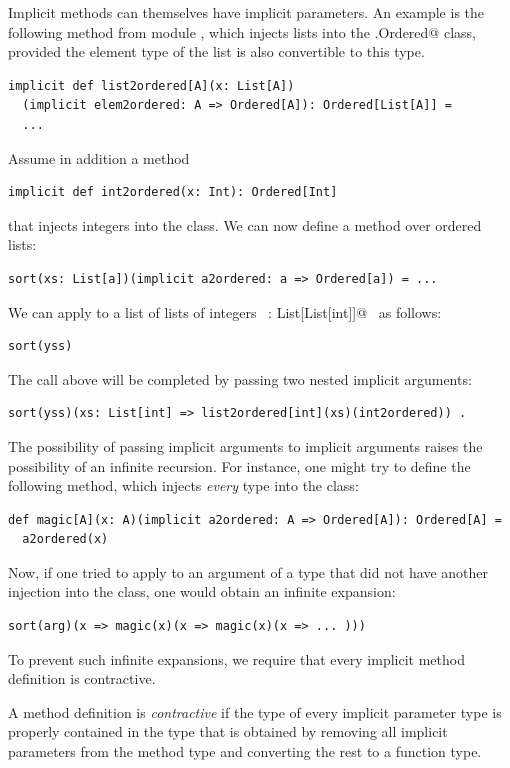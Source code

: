 Implicit methods can themselves have implicit parameters. An example
is the following method from module , which injects
lists into the \lstinline@scala.Ordered@ class, provided the element
type of the list is also convertible to this type.
\begin{lstlisting}
implicit def list2ordered[A](x: List[A])
  (implicit elem2ordered: A => Ordered[A]): Ordered[List[A]] = 
  ...
\end{lstlisting}
Assume in addition a method
\begin{lstlisting}
implicit def int2ordered(x: Int): Ordered[Int]
\end{lstlisting}
that injects integers into the \lstinline@Ordered@ class.  We can now
define a  method over ordered lists:
\begin{lstlisting}
sort(xs: List[a])(implicit a2ordered: a => Ordered[a]) = ...
\end{lstlisting}
We can apply  to a list of lists of integers ~\lstinline@yss: List[List[int]]@~ 
as follows:
\begin{lstlisting}
sort(yss)
\end{lstlisting}
The call above will be completed by passing two nested implicit arguments:
\begin{lstlisting}
sort(yss)(xs: List[int] => list2ordered[int](xs)(int2ordered)) .
\end{lstlisting}
The possibility of passing implicit arguments to implicit arguments
raises the possibility of an infinite recursion.  For instance, one
might try to define the following method, which injects {\em every} type into the \lstinline@Ordered@ class:
\begin{lstlisting}
def magic[A](x: A)(implicit a2ordered: A => Ordered[A]): Ordered[A] = 
  a2ordered(x)
\end{lstlisting}
Now, if one tried to apply
\lstinline@sort@ to an argument  of a type that did not have
another injection into the  class, one would obtain an infinite
expansion:
\begin{lstlisting}
sort(arg)(x => magic(x)(x => magic(x)(x => ... )))
\end{lstlisting}
To prevent such infinite expansions, we require that every implicit 
method definition is contractive.

A method definition is {\em contractive} if the type of every implicit
parameter type is properly contained in the type that is obtained by
removing all implicit parameters from the method type and converting
the rest to a function type.

